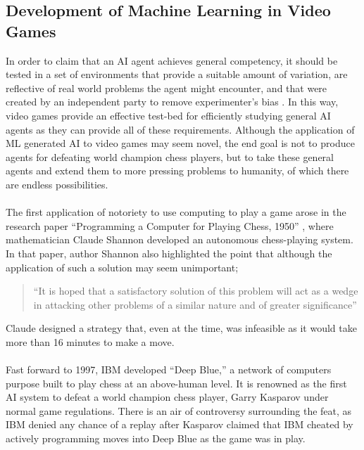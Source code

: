\subsection{Development of Machine Learning in Video Games}
In order to claim that an AI agent achieves general competency, it should be tested in a set of
environments that provide a suitable amount of variation, are reflective of real world problems the
agent might encounter, and that were created by an independent party to remove experimenter's bias
\cite{ale-eval-plat}. In this way, video games provide an effective test-bed for efficiently
studying general AI agents as they can provide all of these requirements. Although the application
of ML generated AI to video games may seem novel, the end goal is not to produce agents for
defeating world champion chess players, but to take these general agents and extend them to more
pressing problems to humanity, of which there are endless possibilities. \paragraph{}

The first application of notoriety to use computing to play a game arose in the research paper
``Programming a Computer for Playing Chess, 1950'' \cite{programming-comp-chess}, where
mathematician Claude Shannon developed an autonomous chess-playing system. In that paper, author
Shannon also highlighted the point that although the application of such a solution may seem
unimportant;
\begin{quote}
    ``It is hoped that a satisfactory solution of this problem will act as a wedge in attacking
    other problems of a similar nature and of greater significance''
\end{quote}
Claude designed a strategy that, even at the time, was infeasible as it would take more than 16
minutes to make a move. \paragraph{}

Fast forward to 1997, IBM developed ``Deep Blue,'' a network of computers purpose built to play
chess at an above-human level. It is renowned as the first AI system to defeat a world champion
chess player, Garry Kasparov under normal game regulations. There is an air of controversy
surrounding the feat, as IBM denied any chance of a replay after Kasparov claimed that IBM cheated
by actively programming moves into Deep Blue as the game was in play. \paragraph{}

